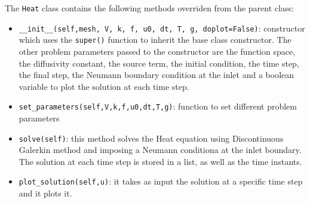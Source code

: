 \documentclass[11pt,a4paper]{article}
\begin{document}
The \texttt{Heat} class contains the following methods overriden from the parent class:
\begin{itemize}
    \item \texttt{\_\_init\_\_(self,mesh, V, k, f, u0, dt, T, g, doplot=False)}: constructor     which uses the \texttt{super()} function to inherit the base class constructor. The other problem parameters passed to the constructor are the function space, the diffusivity constant, the source term, the initial condition, the time step, the final step, the Neumann boundary condition at the inlet and a boolean variable to plot the solution at each time step. 
    \item \texttt{set\_parameters(self,V,k,f,u0,dt,T,g)}: function to set different problem parameters
    \item \texttt{solve(self)}: this method solves the Heat equation using Discontinuous Galerkin method and imposing a Neumann conditiona at the inlet boundary. The solution at each time step is stored in a list, as well as the time instants. 
    \item \texttt{plot\_solution(self,u)}: it takes as input the solution at a specific time step and it plots it.
\end{itemize}
\end{document}

